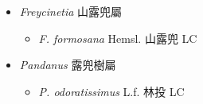 
  \begin{itemize}
 \item[] \textit{Freycinetia} 山露兜屬
                                
  \begin{itemize}
        \item[] \textit{F. formosana} Hemsl.  山露兜   LC
  \end{itemize}
 \item[] \textit{Pandanus} 露兜樹屬
                                
  \begin{itemize}
        \item[] \textit{P. odoratissimus} L.f.  林投   LC
  \end{itemize}
  \end{itemize}
